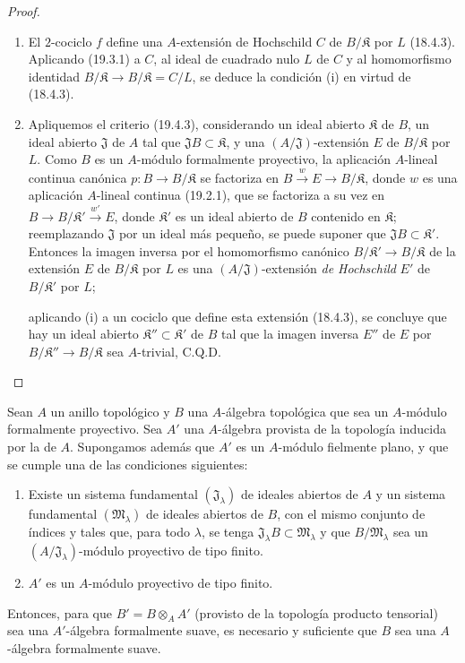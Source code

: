 \begin{proof}
\begin{enumerate}
  \item[(i)] El $2$-cociclo $f$ define una $A$-extensión de Hochschild $C$
  de $B/\mathfrak K$ por $L$ (18.4.3). Aplicando (19.3.1) a $C$, al ideal
  de cuadrado nulo $L$ de $C$ y al homomorfismo identidad
  $B/\mathfrak K\to B/\mathfrak K=C/L$, se deduce la condición (i) en
  virtud de (18.4.3).
  \item[(ii)] Apliquemos el criterio (19.4.3), considerando un ideal abierto
  $\mathfrak K$ de $B$, un ideal abierto $\mathfrak J$ de $A$ tal que
  $\mathfrak JB\subset\mathfrak K$, y una $(A/\mathfrak J)$-extensión $E$
  de $B/\mathfrak K$ por $L$. Como $B$ es un $A$-módulo formalmente
  proyectivo, la aplicación $A$-lineal continua canónica
  $p:B\to B/\mathfrak K$ se factoriza en
  $B\xrightarrow{w}E\to B/\mathfrak K$, donde $w$ es una aplicación
  $A$-lineal continua (19.2.1), que se factoriza a su vez en
  $B\to B/\mathfrak K'\xrightarrow{w'}E$, donde $\mathfrak K'$ es un ideal
  abierto de $B$ contenido en $\mathfrak K$; reemplazando $\mathfrak J$ por
  un ideal más pequeño, se puede suponer que
  $\mathfrak JB\subset\mathfrak K'$. Entonces la imagen inversa por
  el homomorfismo canónico $B/\mathfrak K'\to B/\mathfrak K$ de
  la extensión $E$ de $B/\mathfrak K$ por $L$ es una
  $(A/\mathfrak J)$-extensión \emph{de Hochschild} $E'$ de
  $B/\mathfrak K'$ por $L$;


  aplicando (i) a un cociclo que define esta extensión (18.4.3), se
  concluye que hay un ideal abierto
  $\mathfrak K''\subset\mathfrak K'$ de $B$ tal que la imagen inversa
  $E''$ de $E$ por $B/\mathfrak K''\to B/\mathfrak K$ sea
  $A$-trivial, C.Q.D.
\end{enumerate}
\end{proof}

\begin{corollary}[19.4.6]
\label{0.19.4.6-fr}
Sean $A$ un anillo topológico y $B$ una $A$-álgebra topológica que sea un
$A$-módulo formalmente proyectivo. Sea $A'$ una $A$-álgebra provista de
la topología inducida por la de $A$. Supongamos además que $A'$ es un
$A$-módulo fielmente plano, y que se cumple una de las condiciones
siguientes:
\begin{enumerate}
  \item[$1^\circ$] Existe un sistema fundamental
  $(\mathfrak J_\lambda)$ de ideales abiertos de $A$ y un sistema fundamental
  $(\mathfrak M_\lambda)$ de ideales abiertos de $B$, con el mismo conjunto
  de índices y tales que, para todo $\lambda$, se tenga
  $\mathfrak J_\lambda B\subset\mathfrak M_\lambda$ y que
  $B/\mathfrak M_\lambda$ sea un
  $(A/\mathfrak J_\lambda)$-módulo proyectivo de tipo finito.
  \item[$2^\circ$] $A'$ es un $A$-módulo proyectivo de tipo finito.
\end{enumerate}
Entonces, para que $B'=B\otimes_A A'$ (provisto de la topología producto tensorial)
sea una $A'$-álgebra formalmente suave, es necesario y suficiente que $B$ sea una
$A$-álgebra formalmente suave.
\end{corollary}

